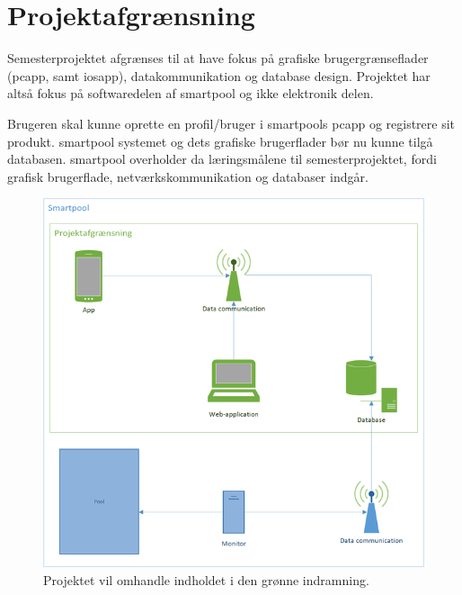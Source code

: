 \section{Projektafgrænsning}
Semesterprojektet afgrænses til at have fokus på grafiske brugergrænseflader (\gls{pcapp}, samt \gls{iosapp}), datakommunikation og database design. Projektet har altså fokus på softwaredelen af \gls{smartpool} og ikke elektronik delen.

Brugeren skal kunne oprette en profil/bruger i \glspl{smartpool} \gls{pcapp} og registrere sit produkt. \gls{smartpool} systemet og dets grafiske brugerflader bør nu kunne tilgå databasen. \gls{smartpool} overholder da læringsmålene til semesterprojektet, fordi grafisk brugerflade, netværkskommunikation og databaser indgår.

\begin{figure}
	\centering
	\includegraphics[width=0.9\linewidth]{figs/afgraensning.png}
	\caption{Projektet vil omhandle indholdet i den grønne indramning.}
	\label{fig:afgraensning}
\end{figure}
